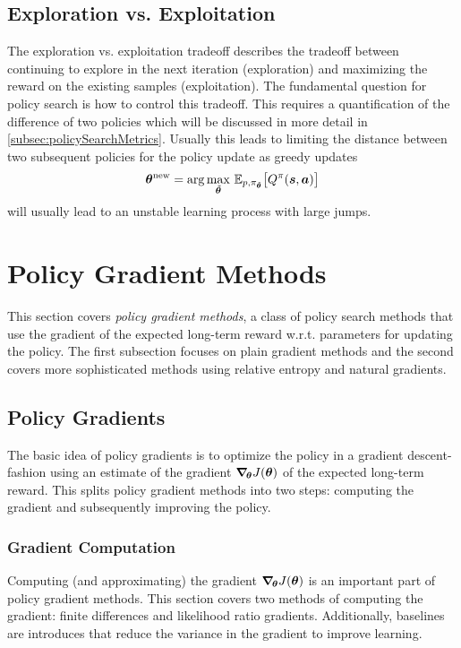 		\subsection{Exploration vs. Exploitation}
			The exploration vs. exploitation tradeoff describes the tradeoff between continuing to explore in the next iteration (exploration) and maximizing the reward on the existing samples (exploitation). The fundamental question for policy search is how to control this tradeoff. This requires a quantification of the difference of two policies which will be discussed in more detail in \autoref{subsec:policySearchMetrics}. Usually this leads to limiting the distance between two subsequent policies for the policy update as greedy updates
			\begin{equation*}
				\bm{\theta}^\mathrm{new} = \arg\max_{\tilde{\bm{\theta}}} \, \mathbb{E}_{p, \pi_{\tilde{\bm{\theta}}}}\big[ Q^\pi(\bm{s}, \bm{a}) \big]
			\end{equation*}
			will usually lead to an unstable learning process with large jumps.

	\section{Policy Gradient Methods}
		This section covers \emph{policy gradient methods}, a class of policy search methods that use the gradient of the expected long-term reward w.r.t. parameters for updating the policy. The first subsection focuses on plain gradient methods and the second covers more sophisticated methods using relative entropy and natural gradients.

		\subsection{Policy Gradients}
			The basic idea of policy gradients is to optimize the policy in a gradient descent-fashion using an estimate of the gradient \( \grad_{\!\bm{\theta}} J(\bm{\theta}) \) of the expected long-term reward. This splits policy gradient methods into two steps: computing the gradient and subsequently improving the policy.

			\subsubsection{Gradient Computation}
				Computing (and approximating) the gradient \( \grad_{\!\bm{\theta}} J(\bm{\theta}) \) is an important part of policy gradient methods. This section covers two methods of computing the gradient: finite differences and likelihood ratio gradients. Additionally, baselines are introduces that reduce the variance in the gradient to improve learning.

